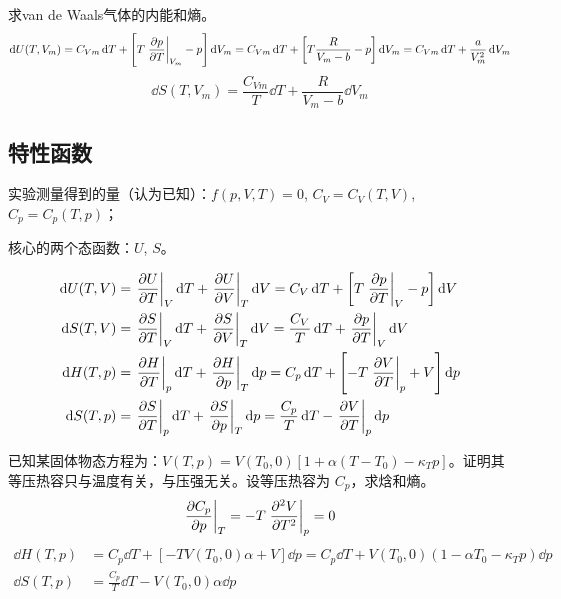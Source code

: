 \begin{framed}
    求van de Waals气体的内能和熵。
    \[
        \dd{U(T, V_m)} = C_{Vm} \dd{T} + \left[T \left.\pdv{p}{T}\right|_{V_m} - p\right] \dd{V_m} = C_{Vm} \dd{T} + \left[T \frac{R}{V_m - b} - p\right] \dd{V_m} = C_{Vm} \dd{T} + \frac{a}{V_m^2} \dd{V_m}
    \]\[
        \dd{S(T, V_m)} = \frac{C_{Vm}}{T} \dd{T} + \frac{R}{V_m - b} \dd{V_m}
    \]
\end{framed}

\subsection{特性函数}

实验测量得到的量（认为已知）：$f(p, V, T) = 0$, $C_V = C_V(T, V)$, $C_p = C_p(T, p)$；

核心的两个态函数：$U$, $S$。

\begin{align*}
    \dd{U(T, V)} & = \left.\pdv{U}{T}\right|_V \dd{T} + \left.\pdv{U}{V}\right|_T \dd{V} = C_V \dd{T} + \left[T \left.\pdv{p}{T}\right|_V - p\right] \dd{V}   \\
    \dd{S(T, V)} & = \left.\pdv{S}{T}\right|_V \dd{T} + \left.\pdv{S}{V}\right|_T \dd{V} = \frac{C_V}{T} \dd{T} + \left.\pdv{p}{T}\right|_V \dd{V}            \\
    \dd{H(T, p)} & = \left.\pdv{H}{T}\right|_p \dd{T} + \left.\pdv{H}{p}\right|_T \dd{p} = C_p \dd{T} + \left[- T \left.\pdv{V}{T}\right|_p + V\right] \dd{p} \\
    \dd{S(T, p)} & = \left.\pdv{S}{T}\right|_p \dd{T} + \left.\pdv{S}{p}\right|_T \dd{p} = \frac{C_p}{T} \dd{T} - \left.\pdv{V}{T}\right|_p \dd{p}
\end{align*}

\begin{framed}
    已知某固体物态方程为：$V(T, p) = V(T_0, 0) \left[1 + \alpha (T - T_0) - \kappa_T p\right]$。证明其等压热容只与温度有关，与压强无关。设等压热容为 $C_p$，求焓和熵。
    \[
        \left.\pdv{C_p}{p}\right|_T = - T \left.\pdv[2]{V}{T}\right|_p = 0
    \]
    \begin{align*}
        \dd{H(T, p)} & = C_p \dd{T} + \left[- T V(T_0, 0) \alpha + V\right] \dd{p} = C_p \dd{T} + V(T_0, 0) \left(1 - \alpha T_0 - \kappa_T p\right) \dd{p} \\
        \dd{S(T, p)} & = \frac{C_p}{T} \dd{T} - V(T_0, 0) \alpha \dd{p}
    \end{align*}
\end{framed}

